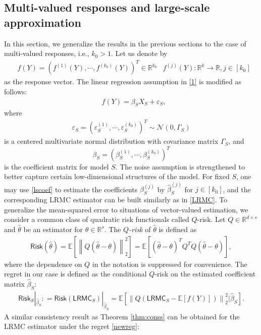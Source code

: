 \documentclass[a4paper,11pt]{article}
\numberwithin{equation}{section}
\theoremstyle{plain}
\theoremstyle{definition}
\def\R{{\mathbb R}}
\def\E{{\mathbb E}}
\def\R{{\mathbb R}}
\def\e{{\varepsilon}}
\def\risk{{\textsf{Risk}}}
\def\lrmc{{\textsf{LRMC}}}
\begin{document}
\subsection{Multi-valued responses and large-scale approximation}\label{sec:vec}


In this section, we generalize the results in the previous sections to the case of multi-valued responses, i.e., $k_0>1$.  
Let us denote by
\begin{align*}
&f(Y) = (f^{(1)}(Y), \cdots, f^{(k_0)}(Y))^T\in\R^{k_0}&f^{(j)}(Y):\R^k\to\R, j\in [k_0]
\end{align*}
as the response vector. 
The linear regression assumption in \eqref{1} is modified as follows:
\begin{align}
&f(Y) = \beta_SX_S + \e_S, \label{newass}
\end{align}
where 
\begin{align*}
\e_S = (\e^{(1)}_{S}, \cdots, \e^{(k_0)}_{S})^T\sim \mathcal N (0, \Gamma_S)
\end{align*}
is a centered multivariate normal distribution with covariance matrix $\Gamma_S$, and 
$$\beta_S = (\beta^{(1)}_{S}, \cdots, \beta^{(k_0)}_{S})^T$$ 
is the coefficient matrix for model $S$. 
The noise assumption is strengthened to better capture certain low-dimensional structures of the model.
For fixed $S$, one may use \eqref{lscoef} to estimate the coefficients $\beta_S^{(j)}$ by $\widehat{\beta}_S^{(j)}$ for $j\in [k_0]$, and the corresponding LRMC estimator can be built similarly as in \eqref{LRMC}.  
To generalize the mean-squared error to situations of vector-valued estimation, we consider a common class of quadratic risk functionals called $Q$-risk. 
Let $Q\in\R^{d\times s}$ and $\widehat{\theta}$ be an estimator for $\theta\in\R^s$. 
The \emph{$Q$-risk} of $\widehat{\theta}$ is defined as 
\begin{align}
\risk(\widehat{\theta}) = \E\left[\left\|Q(\widehat{\theta}-\theta)\right\|_2^2\right] = \E\left[(\widehat{\theta}-\theta)^TQ^TQ(\widehat{\theta}-\theta)\right],
\end{align}
where the dependence on $Q$ in the notation is suppressed for convenience.   
The regret in our case is defined as the conditional $Q$-risk on the estimated coefficient matrix $\widehat{\beta}_S$:
\begin{align}
\risk_S|_{\widehat{\beta}_S}: = \risk(\lrmc_S)|_{\widehat{\beta}_S} = \E\left[\left\|Q(\lrmc_S-\E[f(Y)])\right\|_2^2|\widehat{\beta}_S\right].\label{newreg}
\end{align}
A similar consistency result as Theorem \ref{thm:conss} can be obtained for the LRMC estimator under the regret \eqref{newreg}: 
\end{document}
